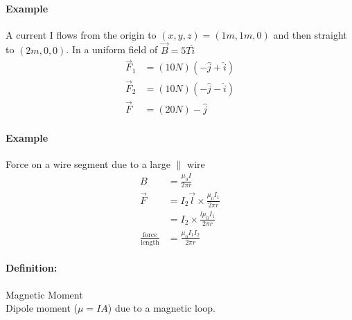 \documentclass{article}
\begin{document}
    \paragraph{Example} A current I flows from the origin to $(x,y,z) = (1m,1m,0)$ and then straight to $(2m,0,0)$. In a uniform field of $\vec{B} = 5T\hat{i}$
    \begin{align*}
        \vec{F}_1 &= (10N)(-\hat{j} + \hat{i})\\
        \vec{F}_2 &= (10N)(-\hat{j}-\hat{i})\\
        \vec{F} &= (20N)-\hat{j}
    \end{align*}

    \paragraph{Example} Force on a wire segment due to a large $\parallel$ wire
    \begin{align*}
        B &= \frac{\mu_0 I}{2\pi r}\\
        \vec{F} &= I_2\vec{l}\times \frac{\mu_0 I_1}{2\pi r}\\
        &= I_2\times \frac{l \mu_0 I_1}{2\pi r}\\
        \frac{\text{force}}{\text{length}} &= \frac{\mu_0 I_1 I_2}{2\pi r}
    \end{align*}
    \paragraph{Definition:}Magnetic Moment\\
    Dipole moment ($\mu = IA$) due to a magnetic loop.
\end{document}
